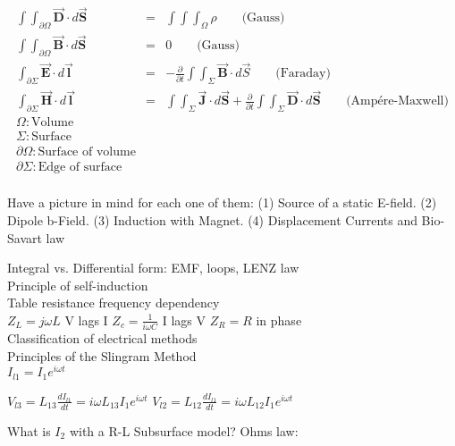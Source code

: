 \documentclass[a4paper,12pt,fleqn]{article}
\begin{document}
 \begin{eqnarray*}
  \int \int_{\partial \Omega} \vec{\mathbf{D}}\cdot d\vec{\mathbf{S}} &=& \int\int\int_{\Omega}\rho \qquad  \text{(Gauss)}\\
  \int \int_{\partial \Omega} \vec{\mathbf{B}}\cdot d\vec{\mathbf{S}} &=& 0 \qquad  \text{(Gauss)} \\
  \int_{\partial \Sigma} \vec{\mathbf{E}}\cdot d\vec{\mathbf{l}} &=& -\frac{\partial} {\partial t} \int\int_{\Sigma}\vec{\mathbf{B}}\cdot{d\vec{S}}\qquad \text{(Faraday)}\\
  \int_{\partial \Sigma} \vec{\mathbf{H}} \cdot d\vec{\mathbf{l}} &=& \int\int_{\Sigma} \vec{\mathbf{J}}\cdot d\vec{\mathbf{S}} + \frac{\partial} {\partial t} \int\int_{\Sigma}\vec{\mathbf{D}}\cdot d\vec{\mathbf{S}} \qquad \text{(Amp\'{e}re-Maxwell)}\\
  \Omega: \text{Volume} \\
  \Sigma: \text{Surface} \\
  \partial \Omega: \text{Surface of volume} \\
  \partial \Sigma: \text{Edge of surface} \\
 \end{eqnarray*}
 
Have a picture in mind for each one of them:
(1) Source of a static E-field.
(2) Dipole b-Field.
(3) Induction with Magnet.
(4) Displacement Currents and Bio-Savart law

Integral vs. Differential form: EMF, loops, LENZ law\\

Principle of self-induction\\

Table resistance frequency dependency \\

$Z_L = j \omega L$  V lags I
$Z_c = \frac{1}{i \omega C}$ I lags V
$Z_R = R$ in phase \\

Classification of electrical methods \\


Principles of the Slingram Method\\

$I_{l1} = I_1 e^{i\omega t}$


$V_{l3} = L_{13}\frac{d I_{l1}}{dt} = i\omega L_{13}I_1e^{i\omega t}$
$V_{l2} = L_{12}\frac{d I_{l1}}{dt} = i\omega L_{12}I_1e^{i\omega t}$

What is $I_2$ with a R-L Subsurface model? Ohms law:
\end{document}
